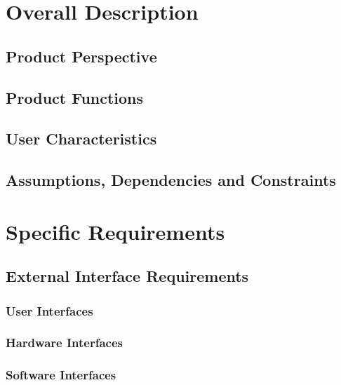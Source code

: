 \documentclass{paper}
\begin{document}
\newpage
\section{Overall Description}

    \subsection{Product Perspective}
    
    \subsection{Product Functions}
    
    \subsection{User Characteristics}
    
    \subsection{Assumptions, Dependencies and Constraints}
    
\newpage
\section{Specific Requirements}

    \subsection{External Interface Requirements}
        
        \subsubsection{User Interfaces}
        
        \subsubsection{Hardware Interfaces}
        
        \subsubsection{Software Interfaces}
        
\end{document}
